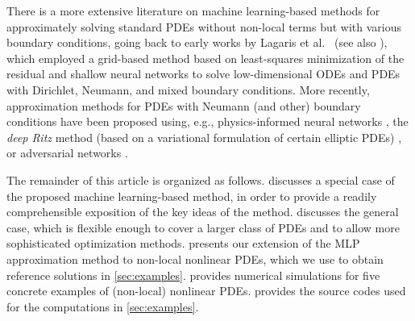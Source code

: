 There is a more extensive literature on machine learning-based methods for approximately solving standard PDEs without non-local terms but with various boundary conditions, going back to early works by Lagaris et al.~\cite{lagaris1998artificial,lagaris2000neural} (see also \cite{mcfall2009artificial}), which employed a grid-based method based on least-squares minimization of the residual and shallow neural networks to solve low-dimensional ODEs and PDEs with Dirichlet, Neumann, and mixed boundary conditions. More recently, approximation methods for PDEs with Neumann (and other) boundary conditions have been proposed using, e.g., physics-informed neural networks \cite{lu2021deepxde,sukumar2022exact,WangPerdikaris2020}, the \emph{deep Ritz} method (based on a variational formulation of certain elliptic PDEs) \cite{e2018deep,liao2021deep,chen2020comparison}, or adversarial networks \cite{zang2020weak}.

The remainder of this article is organized as follows.   discusses a special case of the proposed machine learning-based method, in order to provide a readily comprehensible exposition of the key ideas of the method.  discusses the general case, which is flexible enough to cover a larger class of PDEs and to allow more sophisticated optimization methods.  presents our extension of the MLP approximation method to non-local nonlinear PDEs, which we use to obtain reference solutions in \cref{sec:examples}.  provides numerical simulations for five concrete examples of (non-local) nonlinear PDEs.  provides the source codes used for the computations in \cref{sec:examples}.




